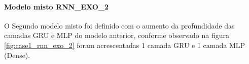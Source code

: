         \paragraph{Modelo misto RNN\_EXO\_2}
         O Segundo modelo misto foi definido com o aumento da profundidade das camadas GRU e MLP do modelo anterior, conforme observado na figura \ref{fig:case1_rnn_exo_2} foram acrescentadas 1 camada GRU e 1 camada MLP (Dense).
            \begin{figure}[h]
            \end{figure}
        

